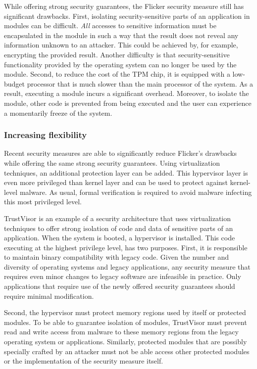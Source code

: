 While offering strong security guarantees, the Flicker security measure still has significant drawbacks. First, isolating security-sensitive parts of an application in modules can be difficult. {\em All} accesses to sensitive information must be encapsulated in the module in such a way that the result does not reveal any information unknown to an attacker. This could be achieved by, for example, encrypting the provided result. Another difficulty is that security-sensitive functionality provided by the operating system can no longer be used by the module. 
Second, to reduce the cost of the TPM chip, it is equipped with a low-budget processor that is much slower than the main processor of the system. As a result, executing a module incurs a significant overhead. Moreover, to isolate the module, other code is prevented from being executed and the user can experience a momentarily freeze of the system.

\subsubsection{Increasing flexibility}


Recent security measures\citep{mccune2010TrustVisor,sahita2009criticalAppsOnMobile} are able to significantly reduce Flicker's drawbacks while offering the same strong security guarantees. Using virtualization techniques, an additional protection layer can be added. This hypervisor layer is even more privileged than kernel layer and can be used to protect against kernel-level malware. As usual, formal verification is required to avoid malware infecting this most privileged level.

TrustVisor is an example of a security architecture that uses virtualization techniques to offer strong isolation of code and data of sensitive parts of an application. When the system is booted, a hypervisor is installed. This code executing at the highest privilege level, has two purposes. First, it is responsible to maintain binary compatibility with legacy code. Given the number and diversity of operating systems and legacy applications, any security measure that requires even minor changes to legacy software are infeasible in practice. Only applications that require use of the newly offered security guarantees should require minimal modification.

Second, the hypervisor must protect memory regions used by itself or protected modules. To be able to guarantee isolation of modules, TrustVisor must prevent read and write access from malware to these memory regions from the legacy operating system or applications. Similarly, protected modules that are possibly specially crafted by an attacker must not be able access other protected modules or the implementation of the security measure itself.

